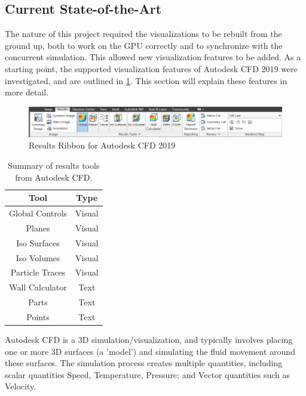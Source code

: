 \subsection{Current State-of-the-Art}
The nature of this project required the visualizations to be rebuilt from the ground up, both to work on the GPU correctly and to synchronize with the concurrent simulation.
This allowed new visualization features to be added.
As a starting point, the supported visualization features of Autodesk CFD 2019 were investigated, and are outlined in \cref{tab:AutodeskCFDSummary}.
This section will explain these features in more detail.

\begin{figure}[ht]
    \centering
    \includegraphics[width=\linewidth]{Ch20Research/figures/results_ribbon.png}
    \caption{Results Ribbon for Autodesk CFD 2019\cite[Results Visualization]{AutodeskCFDManual}}
    \label{fig:AutodeskCFDRibbon}
\end{figure}

\begin{table}[ht]
    \centering
    \begin{tabular}{c|c}
        Tool & Type \\
        \hline
        Global Controls & Visual \\
        Planes & Visual \\
        Iso Surfaces & Visual \\
        Iso Volumes & Visual \\
        Particle Traces & Visual \\
        \hline
        Wall Calculator & Text \\
        Parts & Text \\
        Points & Text \\
    \end{tabular}
    \caption{Summary of results tools from Autodesk CFD.}
    \label{tab:AutodeskCFDSummary}
\end{table}

Autodesk CFD is a 3D simulation/visualization, and typically involves placing one or more 3D surfaces (a 'model') and simulating the fluid movement around these surfaces.
The simulation process creates multiple quantities, including scalar quantities Speed, Temperature, Pressure; and Vector quantities such as Velocity.

